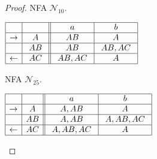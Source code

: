 \documentclass[preprint,12pt]{elsarticle}
\newcommand{\cN}{{\mathcal N}}
\begin{document}
\begin{proof}
\begin{table}[hbt]
\begin{minipage}[b]{0.45\linewidth}
\caption{NFA $\cN_{10}$.}
\label{tab:fn10}
{\footnotesize
\begin{center}
$
\begin{array}{|c| c||c| c| }    
\hline
& \ \  \ \ 
&\ \ a \ \ &\ \ b \ \ \\
\hline  
\rightarrow & A
& \ AB \ & \ A \ \\
\hline  
 & AB
&  AB  & \  AB,AC \ \\
\hline  
\leftarrow & \ AC \
 & \ AB,AC \ & \ A \ \\
\hline  
\end{array}
$
\end{center}}
\end{minipage}
\hspace{0.2cm}
\begin{minipage}[b]{0.45\linewidth}
\caption{NFA $\cN_{25}$.}
\label{tab:fn25}
{\footnotesize
\begin{center}
$
\begin{array}{|c| c||c| c| c|c|}    
\hline
& \ \  \ \ 
&\ \ a \ \ &\ \ b \ \   \\
\hline  
\rightarrow & \ A \
&  \ A,AB \  &  \  A  \   \\
\hline  
 & AB
&  \  A,AB \  & \ A,AB,AC \ \\
\hline  
\leftarrow & AC
&   \ A,AB,AC  \  &   A   \\
\hline  
\end{array}
$
\end{center}}
\end{minipage}
\end{table}


\end{proof}
\end{document}
